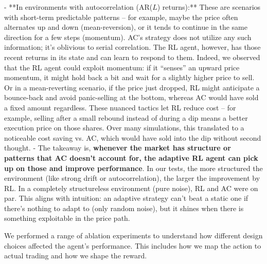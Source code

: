 \documentclass[11pt]{article}
\begin{document}
		- **In environments with autocorrelation (AR($L$) returns):** These are scenarios with short-term predictable patterns – for example, maybe the price often alternates up and down (mean-reversion), or it tends to continue in the same direction for a few steps (momentum). AC’s strategy does not utilize any such information; it’s oblivious to serial correlation. The RL agent, however, has those recent returns in its state and can learn to respond to them. Indeed, we observed that the RL agent could exploit momentum: if it “senses” an upward price momentum, it might hold back a bit and wait for a slightly higher price to sell. Or in a mean-reverting scenario, if the price just dropped, RL might anticipate a bounce-back and avoid panic-selling at the bottom, whereas AC would have sold a fixed amount regardless. These nuanced tactics let RL reduce cost – for example, selling after a small rebound instead of during a dip means a better execution price on those shares. Over many simulations, this translated to a noticeable cost saving vs. AC, which would have sold into the dip without second thought.
		- The takeaway is, \textbf{whenever the market has structure or patterns that AC doesn’t account for, the adaptive RL agent can pick up on those and improve performance}. In our tests, the more structured the environment (like strong drift or autocorrelation), the larger the improvement by RL. In a completely structureless environment (pure noise), RL and AC were on par. This aligns with intuition: an adaptive strategy can’t beat a static one if there’s nothing to adapt to (only random noise), but it shines when there is something exploitable in the price path.
	
	
	
		We performed a range of ablation experiments to understand how different design choices affected the agent’s performance. This includes how we map the action to actual trading and how we shape the reward.
		
\end{document}
